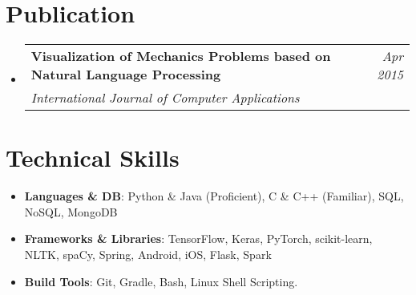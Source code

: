 \documentclass[letterpaper,10pt]{article}
\makeatletter
\newcommand{\resumeSubheadingTable}[4]{
	\vspace{1pt}\item[]
	\begin{tabular*}{\textwidth}[t]{l@{\extracolsep{\fill}}r}
		\textbf{#1} & \textit{\small#2} \\
		\textit{\small#3} & \textit{\small #4} \\
	\end{tabular*}\vspace{-4pt}
}
\newcommand{\resumeSubHeadingListStart}{\begin{itemize}[leftmargin=\hoffset]}
\newcommand{\resumeSubHeadingListEnd}{\end{itemize}}
\makeatother
\begin{document}
	\section{\faGraduationCap \space Publication}
	\resumeSubHeadingListStart
	\resumeSubheadingTable
	{Visualization of Mechanics Problems based on Natural Language Processing}{Apr 2015}
	{International Journal of Computer Applications}{}
	\resumeSubHeadingListEnd
	
	\section{\faBolt \space Technical Skills}
	\resumeSubHeadingListStart
	\item{
		\textbf{Languages \& DB}{: Python \& Java (Proficient), C \& C++ (Familiar), SQL, NoSQL, MongoDB}}
	\vspace{-4pt}
	\item{
		\textbf{Frameworks \& Libraries}{: TensorFlow, Keras, PyTorch, scikit-learn, NLTK, spaCy, Spring, Android, iOS, Flask, Spark}}
	\vspace{-4pt}
	\item{
		\textbf{Build Tools}{: Git, Gradle, Bash, Linux Shell Scripting.}}
	\resumeSubHeadingListEnd
	
	
	
\end{document}
